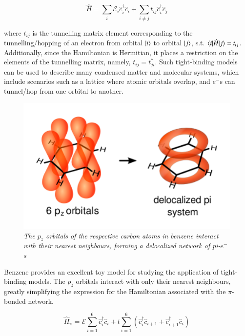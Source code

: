 \documentclass{resonance}
\begin{document}
\begin{equation}
    \hat{H} = \sum_{i}\mathcal{E}_{i} \hat{c}_{i}^{\dagger} \hat{c}_{i} + \sum_{i \neq j}t_{ij} \hat{c}_{i}^{\dagger} \hat{c}_{j}
\end{equation}

where $t_{ij}$ is the tunnelling matrix element corresponding to the tunnelling/hopping of an electron from orbital $\ket{i}$ to orbital $\ket{j}$, s.t. $\braket{i|\hat{H}|j} = t_{ij}$. Additionally, since the Hamiltonian is Hermitian, it places a restriction on the elements of the tunnelling matrix, namely, $t_{ij} = t_{ji}^{*}$. Such tight-binding models can be used to describe many condensed matter and molecular systems, which include scenarios such as a lattice where atomic orbitals overlap, and $e^{-}$s can tunnel/hop from one orbital to another. \par

\begin{figure}[!t]
\caption{\textit{The $p_{z}$ orbitals of the respective carbon atoms in benzene interact with their nearest neighbours, forming a delocalized network of pi-$e^{-}$s}}\label{benzene}
\centering
\includegraphics[scale=0.7]{benzene.png}
\end{figure}

Benzene provides an excellent toy model for studying the application of tight-binding models. The $p_{z}$ orbitals interact with only their nearest neighbours, greatly simplifying the expression for the Hamiltonian associated with the $\pi$-bonded network.

\begin{equation}
    \hat{H}_{\pi} = \mathcal{E}\sum_{i = 1}^{6}\hat{c}_{i}^{\dagger} \hat{c}_{i} + t\sum_{i = 1}^{6} (\hat{c}_{i}^{\dagger} \hat{c}_{i+1} + \hat{c}_{i+1}^{\dagger} \hat{c}_{i})
\end{equation}
\end{document}
